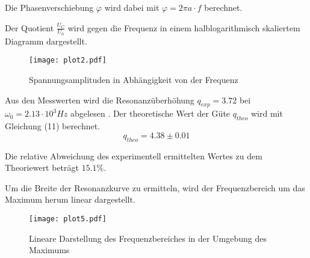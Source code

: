 Die Phasenverschiebung $\varphi$ wird dabei mit $\varphi = 2 \pi a \cdot f$ berechnet. 


Der Quotient $\frac{U_C}{U_0}$ wird gegen die Frequenz in einem halblogarithmisch skaliertem Diagramm
dargestellt.


\begin{figure}[H]
  \centering
  \texttt{[image: plot2.pdf]}
  \caption{Spannungsamplituden in Abhängigkeit von der Frequenz}
  \label{fig:plot2}
\end{figure}

Aus den Messwerten wird die Resonanzüberhöhung $q_{exp} = 3.72$ bei $\omega_0 = 2.13 \cdot 10^{3}Hz$ abgelesen . Der theoretische Wert der
Güte $q_{theo}$ wird mit Gleichung (11) berechnet.
\begin{equation*}
  q_{theo} = 4.38 \pm 0.01
\end{equation*}

Die relative Abweichung des experimentell ermittelten Wertes zu dem Theoriewert beträgt $15.1\%$.

Um die Breite der Resonanzkurve zu ermitteln, wird der Frequenzbereich um das Maximum herum linear dargestellt.

\begin{figure}[H]
  \centering
  \texttt{[image: plot5.pdf]}
  \caption{Lineare Darstellung des Frequenzbereiches in der Umgebung des Maximums}
  \label{fig:plot5}
\end{figure}
